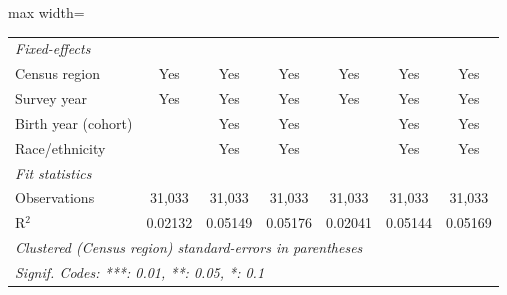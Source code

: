 \begin{adjustbox}{max width=\linewidth}
\begin{tabular}{lcccccc}
      \midrule
      \emph{Fixed-effects}\\
      Census region                                      & Yes           & Yes           & Yes          & Yes          & Yes           & Yes\\  
      Survey year                                        & Yes           & Yes           & Yes          & Yes          & Yes           & Yes\\  
      Birth year (cohort)                                &               & Yes           & Yes          &              & Yes           & Yes\\  
      Race/ethnicity                                     &               & Yes           & Yes          &              & Yes           & Yes\\  
      \midrule
      \emph{Fit statistics}\\
      Observations                                       & 31,033        & 31,033        & 31,033       & 31,033       & 31,033        & 31,033\\  
      R$^2$                                              & 0.02132       & 0.05149       & 0.05176      & 0.02041      & 0.05144       & 0.05169\\  
      \midrule \midrule
      \multicolumn{7}{l}{\emph{Clustered (Census region) standard-errors in parentheses}}\\
      \multicolumn{7}{l}{\emph{Signif. Codes: ***: 0.01, **: 0.05, *: 0.1}}\\
   \end{tabular}
      \end{adjustbox}
\vspace{3pt}\par{}
